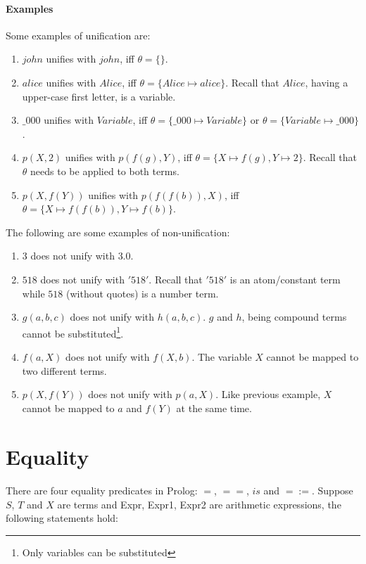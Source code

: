 \documentclass{article}
\begin{document}
\begin{multicols}{2}
  \paragraph{Examples} Some examples of unification are:
  
  \begin{enumerate}
  \item $john$ unifies with $john$, iff $\theta = \{\}$.
  \item $alice$ unifies with $Alice$, iff $\theta = \{Alice \mapsto alice\}$. Recall that $Alice$, having a upper-case first letter, is a variable.
  \item $\_000$ unifies with $Variable$, iff $\theta = \{\_000 \mapsto Variable\}$ or $\theta = \{Variable \mapsto \_000\}$.
  \item $p(X, 2)$ unifies with $p(f(g), Y)$, iff $\theta = \{X \mapsto f(g), Y \mapsto 2\}$. Recall that $\theta$ needs to be applied to both terms.
  \item $p(X, f(Y))$ unifies with $p(f(f(b)), X)$, iff $\theta = \{X \mapsto f(f(b)), Y \mapsto f(b)\}$.
  \end{enumerate}
  
  The following are some examples of non-unification:
  
  \begin{enumerate}
  \item $3$ does not unify with $3.0$.
  \item $518$ does not unify with $'518'$. Recall that $'518'$ is an atom/constant term while $518$ (without quotes) is a number term.
  \item $g(a, b, c)$ does not unify with $h(a, b, c)$. $g$ and $h$, being compound terms cannot be substituted\footnote{Only variables can be substituted}.
  \item $f(a, X)$ does not unify with $f(X, b)$. The variable $X$ cannot be mapped to two different terms.
  \item $p(X, f(Y))$ does not unify with $p(a, X)$. Like previous example, $X$ cannot be mapped to $a$ and $f(Y)$ at the same time.
  \end{enumerate}
  
  \section{Equality}
  
  \paragraph{} There are four equality predicates in Prolog: $=$, $==$, $is$ and $=:=$. Suppose $S$, $T$ and $X$ are terms and Expr, Expr1, Expr2 are arithmetic expressions, the following statements hold:
  

\end{multicols}
\end{document}

